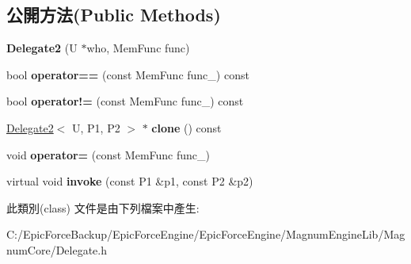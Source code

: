 \subsection*{公開方法(Public Methods)}
\begin{DoxyCompactItemize}
\item 
{\bfseries Delegate2} (U $\ast$who, Mem\+Func func)\hypertarget{class_magnum_1_1_delegate2_a5a9cd5cd48b52c83f1ef8b789198a0c6}{}\label{class_magnum_1_1_delegate2_a5a9cd5cd48b52c83f1ef8b789198a0c6}

\item 
bool {\bfseries operator==} (const Mem\+Func func\+\_\+) const \hypertarget{class_magnum_1_1_delegate2_a2ab13082aa88741f7f4e3fc206973d21}{}\label{class_magnum_1_1_delegate2_a2ab13082aa88741f7f4e3fc206973d21}

\item 
bool {\bfseries operator!=} (const Mem\+Func func\+\_\+) const \hypertarget{class_magnum_1_1_delegate2_a60a778aecf01289c0f6ee83572469a47}{}\label{class_magnum_1_1_delegate2_a60a778aecf01289c0f6ee83572469a47}

\item 
\hyperlink{class_magnum_1_1_delegate2}{Delegate2}$<$ U, P1, P2 $>$ $\ast$ {\bfseries clone} () const \hypertarget{class_magnum_1_1_delegate2_a75f9b16ba87a3913085767f71c5cda40}{}\label{class_magnum_1_1_delegate2_a75f9b16ba87a3913085767f71c5cda40}

\item 
void {\bfseries operator=} (const Mem\+Func func\+\_\+)\hypertarget{class_magnum_1_1_delegate2_a61e9264f15b9892c34952fd0dde35118}{}\label{class_magnum_1_1_delegate2_a61e9264f15b9892c34952fd0dde35118}

\item 
virtual void {\bfseries invoke} (const P1 \&p1, const P2 \&p2)\hypertarget{class_magnum_1_1_delegate2_a304da85acb1c556cf25c73dd30ea8181}{}\label{class_magnum_1_1_delegate2_a304da85acb1c556cf25c73dd30ea8181}

\end{DoxyCompactItemize}


此類別(class) 文件是由下列檔案中產生\+:\begin{DoxyCompactItemize}
\item 
C\+:/\+Epic\+Force\+Backup/\+Epic\+Force\+Engine/\+Epic\+Force\+Engine/\+Magnum\+Engine\+Lib/\+Magnum\+Core/Delegate.\+h\end{DoxyCompactItemize}
